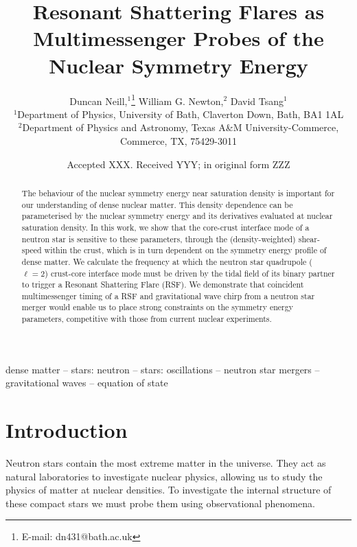 \documentclass[fleqn,usenatbib]{mnras}
\title[Symmetry Energy Constraints from RSFs]{Resonant Shattering Flares as Multimessenger Probes of the Nuclear Symmetry Energy}
\author[D. Neill et al.]{
Duncan Neill,$^{1}$\thanks{E-mail: dn431@bath.ac.uk}
William G. Newton,$^{2}$
David Tsang$^{1}$
\\
$^{1}$Department of Physics, University of Bath, Claverton Down, Bath, BA1 1AL\\
$^{2}$Department of Physics and Astronomy, Texas A\&M University-Commerce, Commerce, TX, 75429-3011
}
\date{Accepted XXX. Received YYY; in original form ZZZ}
\begin{document}
\label{firstpage}
\pagerange{\pageref{firstpage}--\pageref{lastpage}}
\maketitle

\begin{abstract}
The behaviour of the nuclear symmetry energy near saturation density is important for our understanding of dense nuclear matter. This density dependence can be parameterised by the nuclear symmetry energy and its derivatives evaluated at nuclear saturation density. In this work, we show that the core-crust interface mode of a neutron star is sensitive to these parameters, through the (density-weighted) shear-speed within the crust, which is in turn dependent on the symmetry energy profile of dense matter. We calculate the frequency at which the neutron star quadrupole ($\ell = 2$) crust-core interface mode must be driven by the tidal field of its binary partner to trigger a Resonant Shattering Flare (RSF). We demonstrate that coincident multimessenger timing of a RSF and gravitational wave chirp from a neutron star merger would enable us to place strong constraints on the symmetry energy parameters, competitive with those from current nuclear experiments.
\end{abstract}

\begin{keywords}
dense matter -- stars: neutron -- stars: oscillations -- neutron star mergers -- gravitational waves -- equation of state
\end{keywords}




\section{Introduction}
\hspace{\parindent}
 
Neutron stars contain the most extreme matter in the universe. They act as natural laboratories to investigate nuclear physics, allowing us to study the physics of matter at nuclear densities. To investigate the internal structure of these compact stars we must probe them using observational phenomena.
\end{document}

